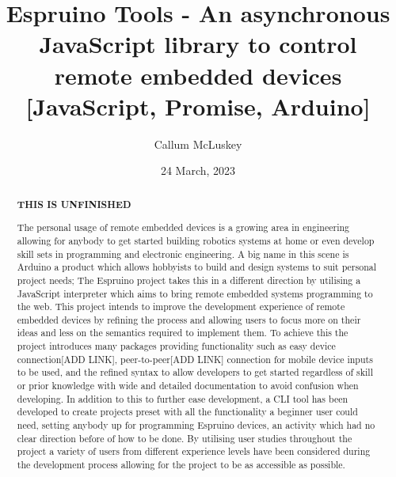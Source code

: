 \documentclass{l4proj}
\begin{document}
\title{Espruino Tools - An asynchronous JavaScript library to control remote embedded devices [JavaScript, Promise, Arduino]}
\author{Callum McLuskey}
\date{24 March, 2023}


\maketitle

\begin{abstract}
    \textbf{THIS IS UNFINISHED}

    The personal usage of remote embedded devices is a growing area in engineering allowing for anybody to get started building robotics systems at home or even develop skill sets in programming and electronic engineering. A big name in this scene is Arduino a product which allows hobbyists to build and design systems to suit personal project needs; The Espruino project takes this in a different direction by utilising a JavaScript interpreter which aims to bring remote embedded systems programming to the web. This project intends to improve the development experience of remote embedded devices by refining the process and allowing users to focus more on their ideas and less on the semantics required to implement them. To achieve this the project introduces many packages providing functionality such as easy device connection[ADD LINK], peer-to-peer[ADD LINK] connection for mobile device inputs to be used, and the refined syntax to allow developers to get started regardless of skill or prior knowledge with wide and detailed documentation to avoid confusion when developing. In addition to this to further ease development, a CLI tool has been developed to create projects preset with all the functionality a beginner user could need, setting anybody up for programming Espruino devices, an activity which had no clear direction before of how to be done. By utilising user studies throughout the project a variety of users from different experience levels have been considered during the development process allowing for the project to be as accessible as possible.

\end{abstract}

\def\consentname {Callum McLuskey} %
\def\consentdate {23 March 2023} %
\end{document}
